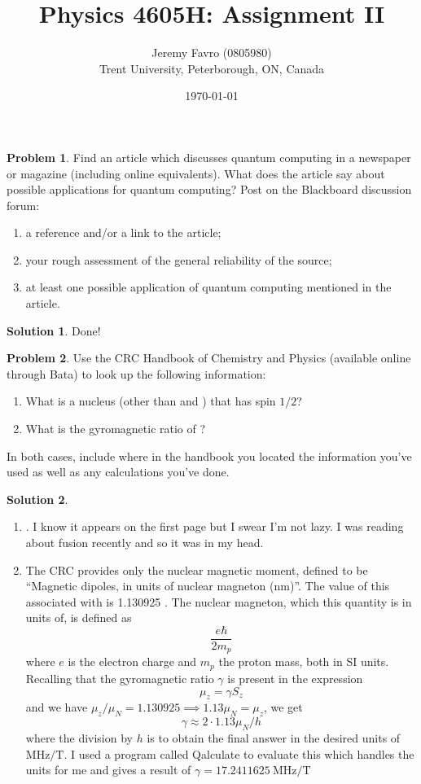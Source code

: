 \documentclass[10pt]{article}
\title{Physics 4605H: Assignment II}
\author{Jeremy Favro (0805980) \\ Trent University, Peterborough, ON, Canada}
\date{\today}
\theoremstyle{definition}
\newtheorem{problem}{Problem}
\newtheorem{soln}{Solution}
\begin{document}
\maketitle

\begin{problem}
Find an article which discusses quantum computing in a newspaper or magazine (including 
online equivalents). What does the article say about possible applications for quantum
computing? Post on the Blackboard discussion forum:
\begin{enumerate}[label=(\roman*)]
  \item a reference and/or a link to the
        article;
  \item your rough assessment of the general reliability of the source;
  \item at least one
        possible application of quantum computing mentioned in the article.
\end{enumerate}
\end{problem}
\begin{soln}
  Done!
\end{soln}

\begin{problem}
Use the CRC Handbook of Chemistry and Physics (available online through Bata) to
look up the following information:
\begin{enumerate}[label=(\alph*)]
  \item What is a nucleus (other than  and ) that has spin $1/2$?
  \item What is the gyromagnetic ratio of ?
\end{enumerate}
In both cases, include where in the handbook you located the information you've used as
well as any calculations you've done.
\end{problem}
\begin{soln}
  \begin{enumerate}[label=(\alph*)]
    \item {}. I know it appears on the first page but I swear I'm not lazy. I was reading about  fusion recently and so it was in my head. \cite{CRC}
    \item The CRC provides only the nuclear magnetic moment, defined to be ``Magnetic dipoles, in units of nuclear magneton (nm)''. The value of this associated with
           is 1.130925 \cite{CRC}. The nuclear magneton, which this quantity is in units of, is defined as $$\frac{e\hbar}{2m_p}$$
          where $e$ is the electron charge and $m_p$ the proton mass, both in SI units. Recalling that the gyromagnetic ratio $\gamma$ is present in the expression
          $$\mu_z=\gamma S_z$$
          and we have $\mu_z/\mu_N=1.130925\implies 1.13\mu_N=\mu_z$, we get
          $$\gamma \approx 2\cdot1.13\mu_N/h$$
          where the division by $h$ is to obtain the final answer in the desired units of $\unit{\mega\hertz\per\tesla}$.
          I used a program called Qalculate to evaluate this which handles the units for me and gives a result of
          $\gamma=\qty{17.2411625}{\mega\hertz\per\tesla}$
  \end{enumerate}
\end{soln}
\end{document}
